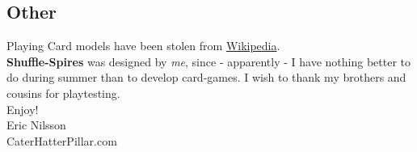\documentclass[11pt]{article} %
\begin{document}
\subsection{Other}

\noindent
Playing Card models have been stolen from \href{''http://en.wikipedia.org/wiki/Playing_card#French_design''}{Wikipedia}. \\

\noindent
\textbf{Shuffle-Spires} was designed by \textit{me}, since - apparently - I have nothing better to do during summer than to develop card-games. I wish to thank my brothers and cousins for playtesting. \\
Enjoy! \\

\noindent
Eric Nilsson \\
CaterHatterPillar.com
\end{document}

